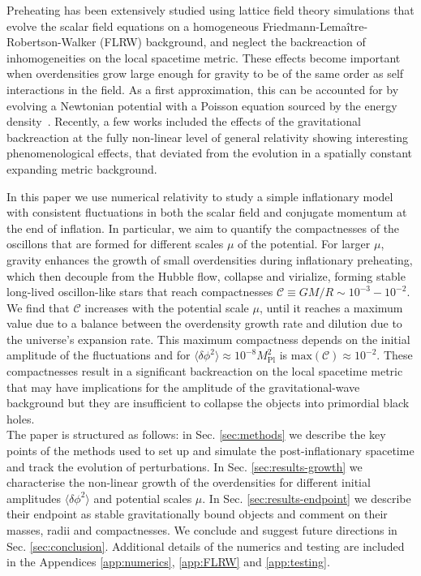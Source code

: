 \documentclass[
    reprint,
    preprintnumbers,
    superscriptaddress,
    nofootinbib,
     amsmath,amssymb,
     aps,
     prd,
    floatfix,
    ]{revtex4-2}
\newcommand{\mpl}{M_\mathrm{Pl}}
\begin{document}
Preheating has been extensively studied using lattice field theory simulations \cite{Felder:2000hq,Frolov:2008hy,Figueroa:2020rrl, Figueroa:2021yhd} that evolve the scalar field equations on a homogeneous Friedmann-Lema{\^ i}tre-Robertson-Walker (FLRW) background, and neglect the backreaction of inhomogeneities on the local spacetime metric. These effects become important when overdensities grow large enough for gravity to be of the same order as self interactions in the field. As a first approximation, this can be accounted for by evolving a Newtonian potential with a Poisson equation sourced by the energy density~\cite{Lozanov:2019ylm, Amin:2019ums}.
Recently, a few works \cite{Kou:2019bbc, Giblin:2019nuv, Kou:2021bij} included the effects of the gravitational backreaction at the fully non-linear level of general relativity showing interesting phenomenological effects, that deviated from the evolution in a spatially constant expanding metric background.

In this paper we use numerical relativity to study a simple inflationary model with consistent fluctuations in both the scalar field and conjugate momentum at the end of inflation. In particular, we aim to quantify the compactnesses of the oscillons that are formed for different scales $\mu$ of the potential. For larger $\mu$, gravity enhances the growth of small overdensities during inflationary preheating, which then decouple from the Hubble flow, collapse and virialize, forming stable long-lived oscillon-like stars that reach compactnesses $\mathcal{C}\equiv GM/R \sim 10^{-3}-10^{-2}$.  We find that $\mathcal{C}$ increases with the potential scale $\mu$, until it reaches a maximum value due to a balance between the overdensity growth rate and dilution due to the universe's expansion rate. This maximum compactness depends on the initial amplitude of the fluctuations and for $\langle\delta\phi^2\rangle \approx 10^{-8}\mpl^2$ is $\mathrm{max}(\mathcal{C})\approx 10^{-2}$. These compactnesses result in a significant backreaction on the local spacetime metric that may have implications for the amplitude of the gravitational-wave background but they are insufficient to collapse the objects into primordial black holes.\\

The paper is structured as follows: in Sec. \ref{sec:methods} we describe the key points of the methods used to set up and simulate the post-inflationary spacetime and track the evolution of perturbations. In Sec. \ref{sec:results-growth} we characterise the non-linear growth of the overdensities for different initial amplitudes $\langle \delta\phi^2 \rangle$ and potential scales $\mu$. In Sec. \ref{sec:results-endpoint} we describe their endpoint as stable gravitationally bound objects and comment on their masses, radii and compactnesses. We conclude and suggest future directions in Sec. \ref{sec:conclusion}. Additional details of the numerics and testing are included in the Appendices \ref{app:numerics}, \ref{app:FLRW} and \ref{app:testing}.
\end{document}

